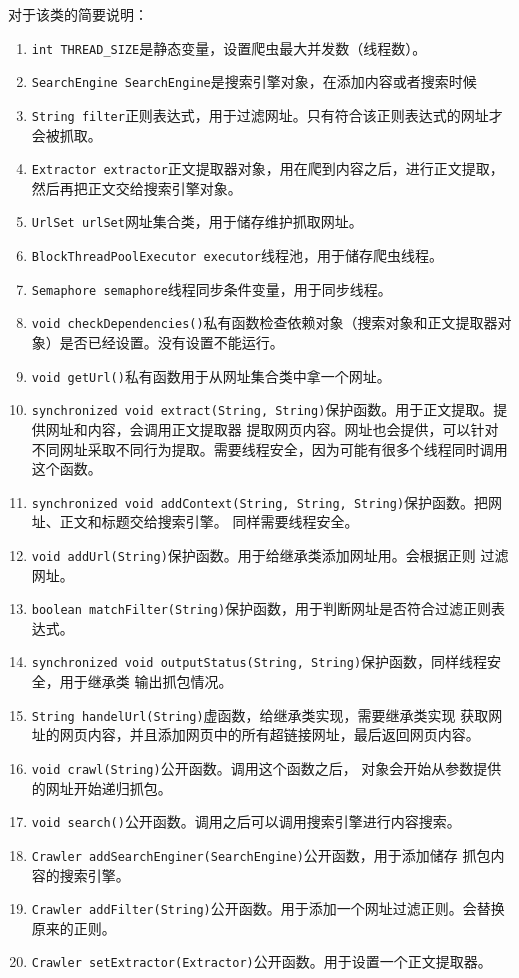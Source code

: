 \documentclass[UTF8,a4paper,12pt]{ctexart}
\begin{document}
对于该类的简要说明：
\begin{enumerate}[label=(\arabic*), wide=2em]
\item \texttt{int THREAD_SIZE}是静态变量，设置爬虫最大并发数（线程数）。
\item \texttt{SearchEngine SearchEngine}是搜索引擎对象，在添加内容或者搜索时候
\item \texttt{String filter}正则表达式，用于过滤网址。只有符合该正则表达式的网址才会被抓取。
\item \texttt{Extractor extractor}正文提取器对象，用在爬到内容之后，进行正文提取，然后再把正文交给搜索引擎对象。
\item \texttt{UrlSet urlSet}网址集合类，用于储存维护抓取网址。
\item \texttt{BlockThreadPoolExecutor executor}线程池，用于储存爬虫线程。
\item \texttt{Semaphore semaphore}线程同步条件变量，用于同步线程。
\item \texttt{void checkDependencies()}私有函数检查依赖对象（搜索对象和正文提取器对象）是否已经设置。没有设置不能运行。
\item \texttt{void getUrl()}私有函数用于从网址集合类中拿一个网址。
\item \texttt{synchronized void extract(String, String)}保护函数。用于正文提取。提供网址和内容，会调用正文提取器
提取网页内容。网址也会提供，可以针对不同网址采取不同行为提取。需要线程安全，因为可能有很多个线程同时调用这个函数。
\item \texttt{synchronized void addContext(String, String, String)}保护函数。把网址、正文和标题交给搜索引擎。
同样需要线程安全。
\item \texttt{void addUrl(String)}保护函数。用于给继承类添加网址用。会根据正则
过滤网址。
\item \texttt{boolean matchFilter(String)}保护函数，用于判断网址是否符合过滤正则表达式。
\item \texttt{synchronized void outputStatus(String, String)}保护函数，同样线程安全，用于继承类
输出抓包情况。
\item \texttt{String handelUrl(String)}虚函数，给继承类实现，需要继承类实现
获取网址的网页内容，并且添加网页中的所有超链接网址，最后返回网页内容。
\item \texttt{void crawl(String)}公开函数。调用这个函数之后，
对象会开始从参数提供的网址开始递归抓包。
\item \texttt{void search()}公开函数。调用之后可以调用搜索引擎进行内容搜索。
\item \texttt{Crawler addSearchEnginer(SearchEngine)}公开函数，用于添加储存
抓包内容的搜索引擎。
\item \texttt{Crawler addFilter(String)}公开函数。用于添加一个网址过滤正则。会替换原来的正则。
\item \texttt{Crawler setExtractor(Extractor)}公开函数。用于设置一个正文提取器。
\end{enumerate}\par
\end{document}

